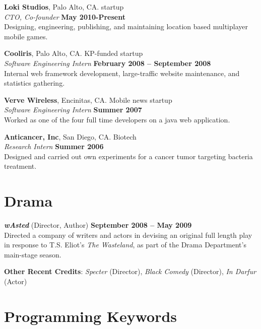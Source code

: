 \documentclass[margin,line]{resume}
\begin{document}
\begin{resume}
    \textbf{Loki Studios}, Palo Alto, CA. startup \vspace{2mm}\\\vspace{1mm}%
    \textsl{CTO, Co-founder} \hfill \textbf{May 2010-Present}\\
    Designing, engineering, publishing, and maintaining location based multiplayer mobile games.

    \textbf{Cooliris}, Palo Alto, CA. KP-funded startup \vspace{2mm}\\\vspace{1mm}%
    \textsl{Software Engineering Intern} \hfill \textbf{February 2008 -- September 2008}\\
    Internal web framework development, large-traffic website maintenance, and statistics gathering.

    \textbf{Verve Wireless}, Encinitas, CA. Mobile news startup \vspace{2mm}\\\vspace{1mm}%
    \textsl{Software Engineering Intern} \hfill \textbf{Summer 2007}\\
    Worked as one of the four full time developers on a java web application.

    \textbf{Anticancer, Inc}, San Diego, CA. Biotech \vspace{2mm}\\\vspace{1mm}%
    \textsl{Research Intern} \hfill \textbf{Summer 2006}\\
    Designed and carried out own experiments for a cancer tumor targeting bacteria treatment.

    \section{\mysidestyle Drama}
    \textbf{\emph{wAsted}} (Director, Author) \hfill \textbf{September 2008 -- May 2009} \\
    Directed a company of writers and actors in devising an original full length play in response to T.S. Eliot's \emph{The Wasteland}, as part of the Drama Department's main-stage season.

    \textbf{Other Recent Credits}: \emph{Specter} (Director), \emph{Black Comedy} (Director), \emph{In Darfur} (Actor) \emph{}


    \section{\mysidestyle Programming Keywords}


\end{resume}
\end{document}
